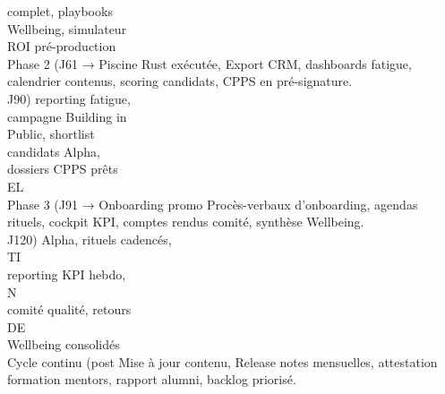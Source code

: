 complet, playbooks\\
Wellbeing, simulateur\\
ROI pré-production\\
Phase 2 (J61 →        Piscine Rust exécutée,     Export CRM, dashboards fatigue, calendrier contenus, scoring candidats, CPPS en pré-signature.\\
J90)                  reporting fatigue,\\
campagne Building in\\
Public, shortlist\\
candidats Alpha,\\
dossiers CPPS prêts\\
\vspace{0.5em}
\vspace{0.5em}
\vspace{0.5em}
\vspace{0.5em}
EL\\
Phase 3 (J91 →        Onboarding promo           Procès-verbaux d’onboarding, agendas rituels, cockpit KPI, comptes rendus comité, synthèse Wellbeing.\\
J120)                 Alpha, rituels cadencés,\\
\vspace{0.5em}
\vspace{0.5em}
\vspace{0.5em}
\vspace{0.5em}
TI\\
reporting KPI hebdo,\\
\vspace{0.5em}
\vspace{0.5em}
\vspace{0.5em}
\vspace{0.5em}
N\\
comité qualité, retours\\
\vspace{0.5em}
\vspace{0.5em}
\vspace{0.5em}
\vspace{0.5em}
DE\\
Wellbeing consolidés\\
Cycle continu (post   Mise à jour contenu,       Release notes mensuelles, attestation formation mentors, rapport alumni, backlog priorisé.\\
\vspace{0.5em}
\vspace{0.5em}
\vspace{0.5em}
\vspace{0.5em}
